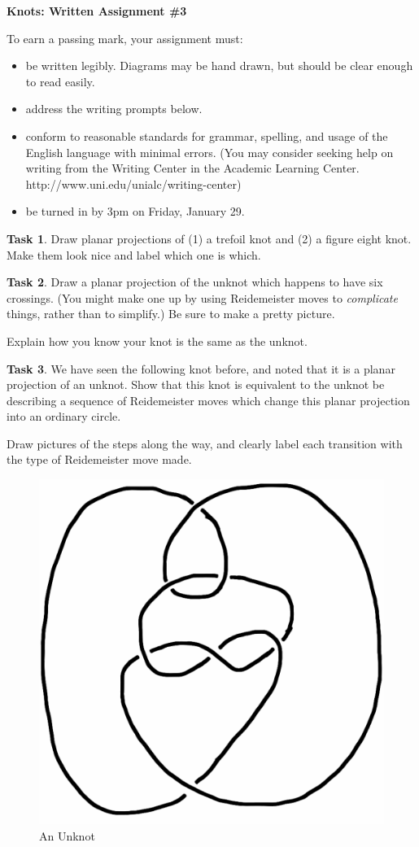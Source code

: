 \documentclass[12pt,letterpaper]{article}
\theoremstyle{definition}
\newtheorem{task}{Task}
\begin{document}
\setlength{\parskip}{1ex plus 0.5ex minus 0.2ex}
\setlength{\parindent}{0pt}

\pagestyle{fancy}
\lfoot{}
\rfoot{}



\begin{center}
{
\Large
\textbf{Knots: Written Assignment \#3}
}
\end{center}

To earn a passing mark, your assignment must:
\begin{itemize}
\item be written legibly. Diagrams may be hand drawn, but should be clear enough to read easily.
\item address the writing prompts below.
\item conform to reasonable standards for grammar, spelling, and usage of the English language with minimal errors. (You may consider seeking help on writing from the Writing Center in the Academic Learning Center. http://www.uni.edu/unialc/writing-center)
\item be turned in by 3pm on Friday, January 29.
\end{itemize}

\begin{task}
Draw planar projections of (1) a trefoil knot and (2) a figure eight knot. Make them look nice and label which one is which.
\end{task}

\begin{task}
Draw a planar projection of the unknot which happens to have six crossings. (You might make one up by using 
Reidemeister moves to \emph{complicate} things, rather than to simplify.) Be sure to make a pretty picture. 

Explain how you know your knot is the same as the unknot. 
\end{task}


\begin{task}
We have seen the following knot before, and noted that it is a planar projection of an unknot.
Show that this knot is equivalent to the unknot be describing a sequence of Reidemeister moves which change this planar projection into an ordinary circle.

Draw pictures of the steps along the way, and clearly label each transition with the type of Reidemeister move made.
\end{task}

\begin{figure}[h]
    \centering
    \includegraphics[width=.5\textwidth]{knotpics/9SeptQ5b.png}
    \caption{An Unknot}
\end{figure}
\end{document}
